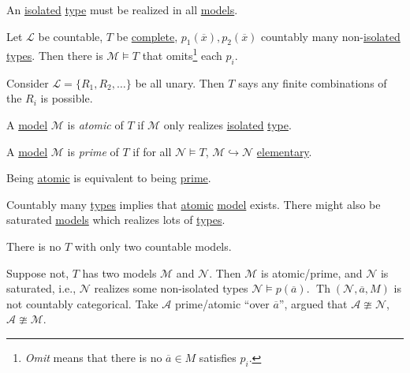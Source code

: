 An \hyperref[def:isolated]{isolated} \hyperref[def:type]{type} must be realized in all \hyperref[def:model]{models}.

\begin{theorem}\label{thm:omitting-types}
	Let \(\mathcal{L} \) be countable, \(T\) be \hyperref[def:theory-complete]{complete}, \(p_1(\overline{x} ), p_2(\overline{x} )\) countably many non-\hyperref[def:isolated]{isolated} \hyperref[def:type]{types}. Then there is \(\mathcal{M} \models T\) that omits\footnote{\emph{Omit} means that there is no \(\overline{a} \in M\) satisfies \(p_i\).} each \(p_i\).
\end{theorem}

\begin{eg}
	Consider \(\mathcal{L} = \{ R_1, R_2, \dots \} \) be all unary. Then \(T\) says any finite combinations of the \(R_i\) is possible.
\end{eg}

\begin{definition}[Atomic]\label{def:atomic}
	A \hyperref[def:model]{model} \(\mathcal{M} \) is \emph{atomic} of \(T\) if \(\mathcal{M} \) only realizes \hyperref[def:isolated]{isolated} \hyperref[def:type]{type}.
\end{definition}

\begin{definition}[Prime]\label{def:prime}
	A \hyperref[def:model]{model} \(\mathcal{M} \) is \emph{prime} of \(T\) if for all \(\mathcal{N} \models T\), \(\mathcal{M} \hookrightarrow \mathcal{N} \) \hyperref[def:elementary-embedding]{elementary}.
\end{definition}

\begin{theorem}
	Being \hyperref[def:atomic]{atomic} is equivalent to being \hyperref[def:prime]{prime}.
\end{theorem}

Countably many \hyperref[def:type]{types} implies that \hyperref[def:atomic]{atomic} \hyperref[def:model]{model} exists. There might also be saturated \hyperref[def:model]{models} which realizes lots of \hyperref[def:type]{types}.

\begin{remark}
	There is no \(T\) with only two countable models.
\end{remark}
\begin{explanation}
	Suppose not, \(T\) has two models \(\mathcal{M} \) and \(\mathcal{N} \). Then \(\mathcal{M} \) is atomic/prime, and \(\mathcal{N} \) is saturated, i.e., \(\mathcal{N} \) realizes some non-isolated types \(\mathcal{N} \models p(\overline{a} )\). \(\mathop{\mathrm{Th}}(\mathcal{N} , \overline{a} , M) \) is not countably categorical. Take \(\mathcal{A} \) prime/atomic ``over \(\overline{a} \)'', argued that \(\mathcal{A} \ncong \mathcal{N} \), \(\mathcal{A} \ncong \mathcal{M} \).
\end{explanation}